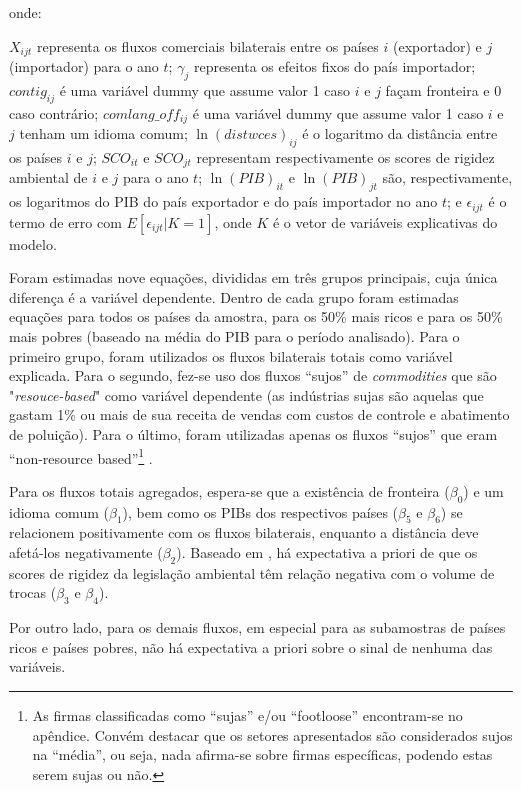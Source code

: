 \documentclass[12pt,
               openright,
               oneside,
               a4paper,
							 section=TITLE,     %
               subsection=Title,  %
               english,brazil]{article}
\begin{document}
onde:

$X_{ijt}$ representa os fluxos comerciais bilaterais entre os países $i$ (exportador) e $j$ (importador) para o ano $t$;  $\gamma_j$ representa os efeitos fixos do país importador; $contig_{ij}$ é uma variável dummy que assume valor 1 caso $i$ e $j$ façam fronteira e 0 caso contrário; $comlang\_off_{ij}$ é uma variável dummy que assume valor 1 caso $i$ e $j$ tenham um idioma comum; $\ln(distwces)_{ij}$ é o logaritmo da distância entre os países $i$ e $j$; $SCO_{it}$ e $SCO_{jt}$ representam respectivamente os scores de rigidez ambiental de $i$ e $j$ para o ano $t$; $\ln(PIB)_{it}$ e $\ln(PIB)_{jt}$ são, respectivamente, os logaritmos do PIB do país exportador e do país importador no ano $t$; e $\epsilon_{ijt}$ é o termo de erro com $E[\epsilon_{ijt} |K=1]$, onde $K$ é o vetor de variáveis explicativas do modelo.

Foram estimadas nove equações, divididas em três grupos principais, cuja única diferença é a variável dependente. Dentro de cada grupo foram estimadas equações para todos os países da amostra, para os 50\% mais ricos e para os 50\% mais pobres (baseado na média do PIB para o período analisado). Para o primeiro grupo, foram utilizados os fluxos bilaterais totais como variável explicada. Para o segundo, fez-se uso dos fluxos “sujos” de \textit{commodities} que são "\textit{resouce-based}" como variável dependente (as indústrias sujas são aquelas que gastam 1\% ou mais de sua receita de vendas com custos de controle e abatimento de poluição). Para o último, foram utilizadas apenas os fluxos “sujos” que eram “non-resource based”\footnote{As firmas classificadas como “sujas” e/ou “footloose” encontram-se no apêndice. Convém destacar que os setores apresentados são considerados sujos na “média”, ou seja, nada afirma-se sobre firmas específicas, podendo estas serem sujas ou não.} . 

Para os fluxos totais agregados, espera-se que a existência de fronteira ($\beta_0$) e um idioma comum ($\beta_1$), bem como os PIBs dos respectivos países ($\beta_5$ e $\beta_6$) se relacionem positivamente com os fluxos bilaterais, enquanto a distância deve afetá-los negativamente ($\beta_2$). Baseado em , há expectativa a priori de que os scores de rigidez da legislação ambiental têm relação negativa com o volume de trocas ($\beta_3$ e $\beta_4$).

Por outro lado, para os demais fluxos, em especial para as subamostras de países ricos e países pobres, não há expectativa a priori sobre o sinal de nenhuma das variáveis.
\end{document}
